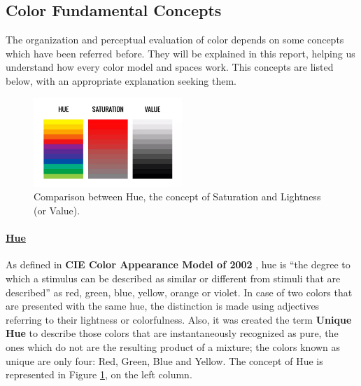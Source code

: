 \documentclass{report}
\begin{document}
\subsection{Color Fundamental Concepts}
The organization and perceptual evaluation of color depends on some concepts which have been referred
before. They will be explained in this report, helping us understand how every color model and spaces work.
This concepts are listed below, with an appropriate explanation seeking them.
%
%
\begin{figure}[H]
  \centering
  \vspace{-10pt}
  \includegraphics[width=0.5\textwidth]{Hue_Saturation_value.png}
  \caption[Hue, Saturation and Value Comparison]{Comparison between Hue, the concept of Saturation and Lightness (or Value).\protect\footnotemark{}}
  \vspace{-25pt}
  \label{fig:hsvconcepts}
\end{figure}
%
\paragraph{\underline{Hue}} As defined in \textbf{CIE Color Appearance Model of 2002} \cite{Moroney2002}, hue is
“the degree to which a stimulus can be described as similar or different from stimuli that are described”
as red, green, blue, yellow, orange or violet. In case of two colors that are presented with the same hue, the
distinction is made using adjectives referring to their lightness or colorfulness. Also, it was created the
term \textbf{Unique Hue} to describe those colors that are instantaneously recognized as pure, the ones which do
not are the resulting product of a mixture; the colors known as unique are only four: Red, Green, Blue
and Yellow. The concept of Hue is represented in Figure \ref{fig:hsvconcepts}, on the left column.
%
\end{document}
